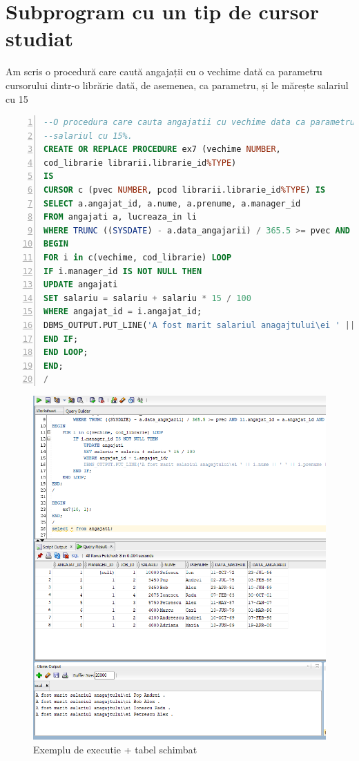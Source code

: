 \documentclass[12pt]{article}
\begin{document}
\section{Subprogram cu un tip de cursor studiat}
Am scris o procedură care caută angajații cu o vechime dată ca parametru cursorului dintr-o librărie dată, de asemenea, ca parametru, și le mărește salariul cu 15%
\begin{lstlisting}[language=SQL,
	showspaces=false,
	basicstyle=\ttfamily,
	numbers=left,
	numberstyle=\tiny,
	breaklines=true,
	commentstyle=\color{gray}]
--O procedura care cauta angajatii cu vechime data ca parametru dintr-o librarie data de asemenea ca parametru si le mareste 
--salariul cu 15%.
CREATE OR REPLACE PROCEDURE ex7 (vechime NUMBER,
cod_librarie librarii.librarie_id%TYPE)
IS
CURSOR c (pvec NUMBER, pcod librarii.librarie_id%TYPE) IS
SELECT a.angajat_id, a.nume, a.prenume, a.manager_id
FROM angajati a, lucreaza_in li
WHERE TRUNC ((SYSDATE) - a.data_angajarii) / 365.5 >= pvec AND li.angajat_id = a.angajat_id AND li.librarie_id = pcod;
BEGIN
FOR i in c(vechime, cod_librarie) LOOP
IF i.manager_id IS NOT NULL THEN
UPDATE angajati
SET salariu = salariu + salariu * 15 / 100
WHERE angajat_id = i.angajat_id;
DBMS_OUTPUT.PUT_LINE('A fost marit salariul anagajtului\ei ' || i.nume || ' ' || i.prenume || ' .');
END IF;
END LOOP;
END;
/
\end{lstlisting}
\begin{figure}[!htb]
	\includegraphics[max width=\linewidth]{imgs/ex7.png}
	\caption{Exemplu de executie + tabel schimbat}
	\label{fig:ex7}
\end{figure}
\end{document}
